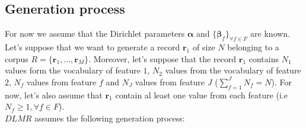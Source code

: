 \subsection{Generation process}
For now we assume that the Dirichlet parameters $\boldsymbol{\alpha}$ and $\{\boldsymbol{\beta }_{f}\}_{\forall f\in F}$ are known. Let's suppose that we want to generate a record $\mathbf{r}_{1}$ of size $N$ belonging to a corpus $R=\{\mathbf{r}_{1},...,\mathbf{r}_{M}\}$. Moreover, let's suppose that the record $\mathbf{r}_{1}$ contains $N_{1}$ values form the vocabulary of feature $1$, $N_{2}$ values from the vocabulary of feature $2$, $N_{f}$ values from feature $f$ and $N_{J}$ values from feature $J$ ($\sum_{f=1}^{J}N_{f}=N$). For now, let's also assume that $\mathbf{r}_{1}$ contain al least one value from each feature (i.e $N_{f}\geq 1,\forall f\in F$).
\\$DLMR$ assumes the following generation process:
